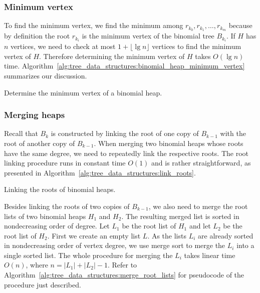 
\subsubsection{Minimum vertex}

To find the minimum vertex, we find the minimum among
$r_{k_0}, r_{k_1}, \dots, r_{k_m}$ because by definition the root
$r_{k_i}$ is the minimum vertex of the binomial tree $B_{k_i}$. If $H$
has $n$ vertices, we need to check at most $1 + \lfloor \lg n \rfloor$
vertices to find the minimum vertex of $H$. Therefore determining the
minimum vertex of $H$ takes $O(\lg n)$ time.
Algorithm~\ref{alg:tree_data_structures:binomial_heap_minimum_vertex}
summarizes our discussion.

\begin{algorithm}[!htbp]

\caption{Determine the minimum vertex of a binomial heap.}
\label{alg:tree_data_structures:binomial_heap_minimum_vertex}
\end{algorithm}



\subsubsection{Merging heaps}

Recall that $B_k$ is constructed by linking the root of one copy of
$B_{k-1}$ with the root of another copy of $B_{k-1}$. When merging two
binomial heaps whose roots have the same degree, we need to repeatedly
link the respective roots. The root linking procedure runs in constant
time $O(1)$ and is rather straightforward, as presented in
Algorithm~\ref{alg:tree_data_structures:link_roots}.

\begin{algorithm}[!htbp]

\caption{Linking the roots of binomial heaps.}
\label{alg:tree_data_structures:link_roots}
\end{algorithm}

Besides linking the roots of two copies of $B_{k-1}$, we also need to
merge the root lists of two binomial heaps $H_1$ and $H_2$. The
resulting merged list is sorted in nondecreasing order of degree. Let
$L_1$ be the root list of $H_1$ and let $L_2$ be the root list of
$H_2$. First we create an empty list $L$. As the lists $L_i$ are
already sorted in nondecreasing order of vertex degree, we use
merge sort to merge the $L_i$ into a single sorted
list. The whole procedure for merging the $L_i$ takes linear time
$O(n)$, where $n = |L_1| + |L_2| - 1$. Refer to
Algorithm~\ref{alg:tree_data_structures:merge_root_lists} for
pseudocode of the procedure just described.

